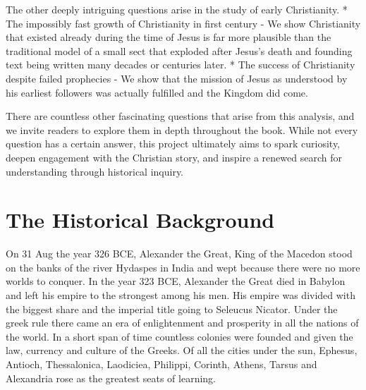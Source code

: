 The other deeply intriguing questions arise in the study of early Christianity.
* The impossibly fast growth of Christianity in first century - We show Christianity that existed already during the time of Jesus is far more plausible than the traditional model of a small sect that exploded after Jesus's death and founding text being written many decades or centuries later.
* The success of Christianity despite failed prophecies - We show that the mission of Jesus as understood by his earliest followers was actually fulfilled and the Kingdom did come.

There are countless other fascinating questions that arise from this analysis, and we invite readers to explore them in depth throughout the book.
While not every question has a certain answer, this project ultimately aims to spark curiosity, deepen engagement with the Christian story, and inspire a renewed search for understanding through historical inquiry.

\section{The Historical Background}\label{par:background-historical}

On 31 Aug the year 326 BCE, Alexander the Great, King of the Macedon stood on the banks of the river Hydaspes in India and wept because there were no more worlds to conquer.
In the year 323 BCE, Alexander the Great died in Babylon and left his empire to the strongest among his men.
His empire was divided with the biggest share and the imperial title going to Seleucus Nicator.
Under the greek rule there came an era of enlightenment and prosperity in all the nations of the world.
In a short span of time countless colonies were founded and given the law, currency and culture of the Greeks.
Of all the cities under the sun, Ephesus, Antioch, Thessalonica, Laodiciea, Philippi, Corinth, Athens, Tarsus and Alexandria rose as the greatest seats of learning.

